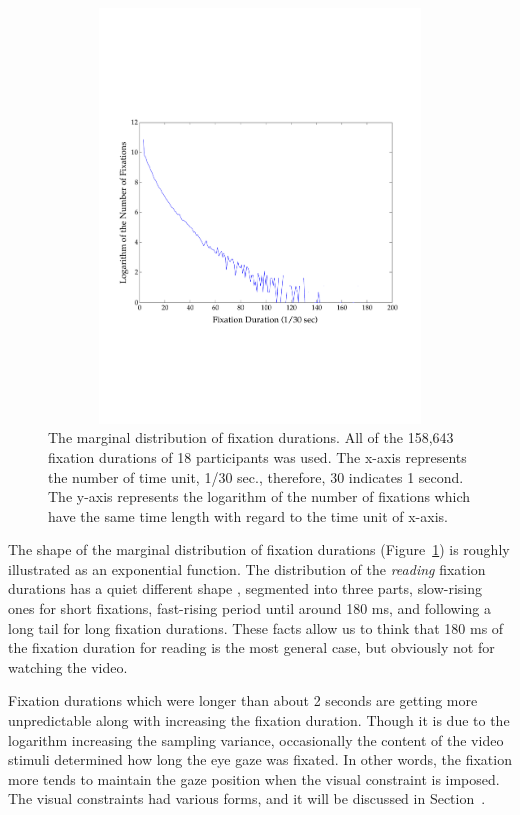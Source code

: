 \documentclass[oneside,master]{snueethesis}
\begin{document}
\begin{figure}
  \centerline{\includegraphics[width=150mm,height=110mm,trim=0mm 60mm 0mm 60mm]{./eps/marginal_fixation_duration.pdf}}
  \caption[The marginal distribution of fixation durations]{The marginal distribution of fixation durations. All of the 158,643 fixation durations of 18 participants was used. The x-axis represents the number of time unit, 1/30 sec., therefore, 30 indicates 1 second. The y-axis represents the logarithm of the number of fixations which have the same time length with regard to the time unit of x-axis.}
  \label{fig:marginal-fixation-duration}
\end{figure}

The shape of the marginal distribution of fixation durations (Figure~\ref{fig:marginal-fixation-duration}) is roughly illustrated as an exponential function. The distribution of the \textit{reading} fixation durations has a quiet different shape \cite{Feng2006}, segmented into three parts, slow-rising ones for short fixations, fast-rising period until around 180 ms, and following a long tail for long fixation durations. These facts allow us to think that 180 ms of the fixation duration for reading is the most general case, but obviously not for watching the video.

Fixation durations which were longer than about 2 seconds are getting more unpredictable along with increasing the fixation duration. Though it is due to the logarithm increasing the sampling variance, occasionally the content of the video stimuli determined how long the eye gaze was fixated. In other words, the fixation more tends to maintain the gaze position when the visual constraint is imposed. The visual constraints had various forms, and it will be discussed in Section~.
\end{document}
